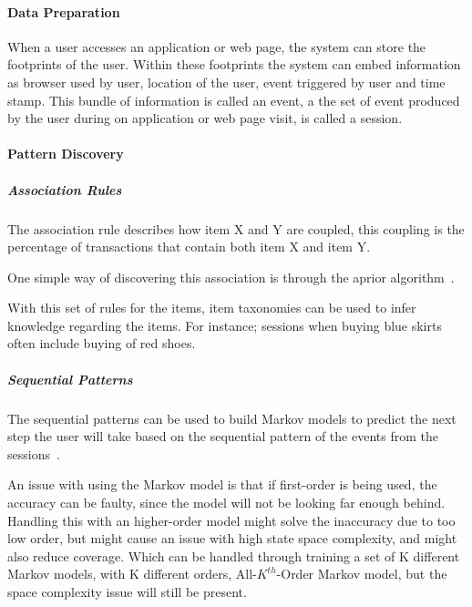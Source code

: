     \paragraph{Data Preparation} %
        \label{par:Data_Preparation}
        When a user accesses an application or web page, the system can store the footprints of the user.
        Within these footprints the system can embed information as browser used by user, location of the user, event triggered by user and time stamp.
        This bundle of information is called an event, a the set of event produced by the user during on application or web page visit, is called a session.

    \paragraph{Pattern Discovery} %
        \label{par:pattern_discovery}
        \subparagraph{Association Rules} %
            \label{subp:association_rules}
            The association rule describes how item X and Y are coupled, this coupling is the percentage of transactions that contain both item X and item Y.

            One simple way of discovering this association is through the aprior algorithm~\cite{Agrawal:1994:FAM:645920.672836}.

            With this set of rules for the items, item taxonomies can be used to infer knowledge regarding the items.
            For instance; sessions when buying blue skirts often include buying of red shoes.
        \subparagraph{Sequential Patterns} %
        \label{subp:sequential_patterns}
            The sequential patterns can be used to build Markov models to predict the next step the user will take based on the sequential pattern of the events from the sessions~\cite{Deshpande:2004:SMM:990301.990304}.

            An issue with using the Markov model is that if first-order is being used, the accuracy can be faulty, since the model will not be looking far enough behind.
            Handling this with an higher-order model might solve the inaccuracy due to too low order, but might cause an issue with high state space complexity, and might also reduce coverage.
            Which can be handled through training a set of K different Markov models, with K different orders, All-$K^{th}$-Order Markov model, but the space complexity issue will still be present.

